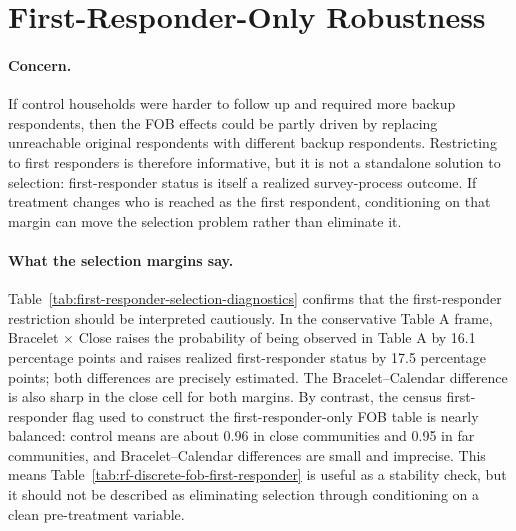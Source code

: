\documentclass[11pt]{article}
\begin{document}
\section{First-Responder-Only Robustness}

\paragraph{Concern.}
If control households were harder to follow up and required more backup respondents, then the FOB effects could be partly driven by replacing unreachable original respondents with different backup respondents. Restricting to first responders is therefore informative, but it is not a standalone solution to selection: first-responder status is itself a realized survey-process outcome. If treatment changes who is reached as the first respondent, conditioning on that margin can move the selection problem rather than eliminate it.

\begin{table}[!htbp]
\centering

\end{table}
\FloatBarrier

\paragraph{What the selection margins say.}
Table~\ref{tab:first-responder-selection-diagnostics} confirms that the first-responder restriction should be interpreted cautiously. In the conservative Table A frame, Bracelet $\times$ Close raises the probability of being observed in Table A by 16.1 percentage points and raises realized first-responder status by 17.5 percentage points; both differences are precisely estimated. The Bracelet--Calendar difference is also sharp in the close cell for both margins. By contrast, the census first-responder flag used to construct the first-responder-only FOB table is nearly balanced: control means are about 0.96 in close communities and 0.95 in far communities, and Bracelet--Calendar differences are small and imprecise. This means Table~\ref{tab:rf-discrete-fob-first-responder} is useful as a stability check, but it should not be described as eliminating selection through conditioning on a clean pre-treatment variable.

\begin{table}[!htbp]
\centering

\end{table}
\FloatBarrier
\end{document}
